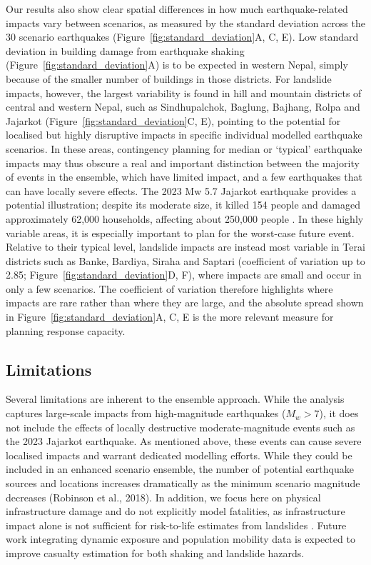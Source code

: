 \documentclass[preprint,12pt,authoryear]{elsarticle}
\begin{document}
Our results also show clear spatial differences in how much earthquake-related impacts vary between scenarios, as measured by the standard deviation across the 30 scenario earthquakes (Figure~\ref{fig:standard_deviation}A, C, E). Low standard deviation in building damage from earthquake shaking (Figure~\ref{fig:standard_deviation}A) is to be expected in western Nepal, simply because of the smaller number of buildings in those districts. For landslide impacts, however, the largest variability is found in hill and mountain districts of central and western Nepal, such as Sindhupalchok, Baglung, Bajhang, Rolpa and Jajarkot (Figure~\ref{fig:standard_deviation}C, E), pointing to the potential for localised but highly disruptive impacts in specific individual modelled earthquake scenarios. In these areas, contingency planning for median or `typical' earthquake impacts may thus obscure a real and important distinction between the majority of events in the ensemble, which have limited impact, and a few earthquakes that can have locally severe effects. The 2023 Mw 5.7 Jajarkot earthquake provides a potential illustration; despite its moderate size, it killed 154 people and damaged approximately 62,000 households, affecting about 250,000 people \citep{UNRCO2024}. In these highly variable areas, it is especially important to plan for the worst-case future event. Relative to their typical level, landslide impacts are instead most variable in Terai districts such as Banke, Bardiya, Siraha and Saptari (coefficient of variation up to 2.85; Figure~\ref{fig:standard_deviation}D, F), where impacts are small and occur in only a few scenarios. The coefficient of variation therefore highlights where impacts are rare rather than where they are large, and the absolute spread shown in Figure~\ref{fig:standard_deviation}A, C, E is the more relevant measure for planning response capacity.

\subsection{Limitations}

Several limitations are inherent to the ensemble approach. While the analysis captures large-scale impacts from high-magnitude earthquakes ($M_w > 7$), it does not include the effects of locally destructive moderate-magnitude events such as the 2023 Jajarkot earthquake. As mentioned above, these events can cause severe localised impacts and warrant dedicated modelling efforts. While they could be included in an enhanced scenario ensemble, the number of potential earthquake sources and locations increases dramatically as the minimum scenario magnitude decreases (Robinson et al., 2018). In addition, we focus here on physical infrastructure damage and do not explicitly model fatalities, as infrastructure impact alone is not sufficient for risk-to-life estimates from landslides \citep{VanWykDeVries2024}. Future work integrating dynamic exposure and population mobility data is expected to improve casualty estimation for both shaking and landslide hazards.
\end{document}
